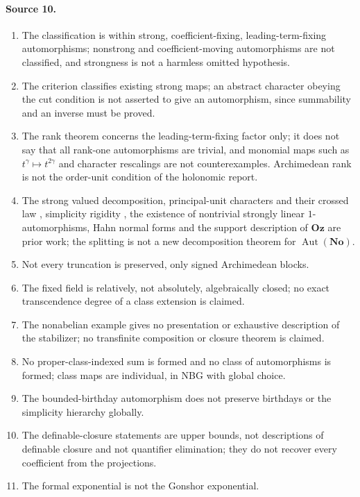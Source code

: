 \documentclass[11pt,oneside]{article}
\numberwithin{equation}{section}
\theoremstyle{definition}
\theoremstyle{remark}
\newcommand{\No}{\mathbf{No}}
\newcommand{\Oz}{\mathbf{Oz}}
\newcommand{\Aut}{\operatorname{Aut}}
\begin{document}
\paragraph{Source 10.}
\begin{enumerate}[itemsep=1pt]
\item The classification is within strong, coefficient-fixing, leading-term-fixing
automorphisms; nonstrong and coefficient-moving automorphisms are not classified,
and strongness is not a harmless omitted hypothesis.
\item The criterion classifies existing strong maps; an abstract character obeying the
cut condition is not asserted to give an automorphism, since summability and an
inverse must be proved.
\item The rank theorem concerns the leading-term-fixing factor only; it does not say
that all rank-one automorphisms are trivial, and monomial maps such as
$t^\gamma\mapsto t^{2\gamma}$ and character rescalings are not counterexamples.
Archimedean rank is not the order-unit condition of the holonomic report.
\item The strong valued decomposition, principal-unit characters and their crossed
law \cite{KS}, simplicity rigidity \cite{KKS}, the existence of nontrivial
strongly linear $1$-automorphisms, Hahn normal forms and the support description
of $\Oz$ \cite{LM} are prior work; the splitting is not a new decomposition
theorem for $\Aut(\No)$.
\item Not every truncation is preserved, only signed Archimedean blocks.
\item The fixed field is relatively, not absolutely, algebraically closed; no exact
transcendence degree of a class extension is claimed.
\item The nonabelian example gives no presentation or exhaustive description of the
stabilizer; no transfinite composition or closure theorem is claimed.
\item No proper-class-indexed sum is formed and no class of automorphisms is
formed; class maps are individual, in NBG with global choice.
\item The bounded-birthday automorphism does not preserve birthdays or the simplicity
hierarchy globally.
\item The definable-closure statements are upper bounds, not descriptions of
definable closure and not quantifier elimination; they do not recover every
coefficient from the projections.
\item The formal exponential is not the Gonshor exponential.

\end{enumerate}
\end{document}
